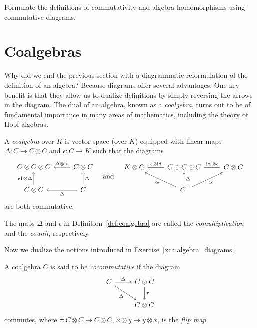 \documentclass[12pt]{amsproc}
\begin{document}
\begin{exercise}
    \label{xca:algebra_diagrams}
    Formulate the definitions of commutativity and algebra homomorphisms using commutative diagrams.
\end{exercise}

\section{Coalgebras}

Why did we end the previous section with a diagrammatic reformulation of the definition of an algebra?
Because diagrams offer several advantages. One key benefit is that they allow us to dualize definitions by simply reversing the arrows in the diagram. The dual of an algebra, known as a \emph{coalgebra}, turns out to be of fundamental importance in many areas of mathematics, including the theory of Hopf algebras.

\begin{definition}
    \label{def:coalgebra}
    A \emph{coalgebra} over $K$ is vector space (over $K$) equipped with linear maps $\Delta\colon C\to C\otimes C$ and 
    $\epsilon\colon C\to K$ such that the diagrams 
    \[
\begin{tikzcd}
C \otimes C \otimes C & C \otimes C \arrow[l, "\Delta \otimes \id"'] \\
C \otimes C\arrow[u, "\id\otimes\Delta"]   & C\arrow[l, "\Delta"]\arrow[u, "\Delta"']
\end{tikzcd}
\quad\text{and}\quad 
\begin{tikzcd}
K\otimes C  & C \otimes C \otimes C\arrow[l, "\epsilon \otimes \id"']\arrow[r, "\id\otimes\epsilon"]  & C \otimes C \\
& C\arrow[lu, "\simeq"]\arrow[u, "\Delta"']\arrow[ru, "\simeq"']\ &
\end{tikzcd}
\]
are both commutative. 
\end{definition}

The maps $\Delta$ and $\epsilon$ in Definition~\ref{def:coalgebra}
are called the \emph{comultiplication} and the \emph{counit}, respectively. 

Now we dualize the notions introduced in Exercise~\ref{xca:algebra_diagrams}.

\begin{definition}
A coalgebra $C$ is said to be \emph{cocommutative} if 
the diagram 
\[
    \begin{tikzcd}
C \arrow[r, "\Delta"] \arrow[dr, "\Delta"'] & C \otimes C \arrow[d, "\tau"] \\
& C \otimes C
\end{tikzcd}
\]
commutes, where $\tau\colon C\otimes C\to C\otimes C$, $x\otimes y\mapsto y\otimes x$, is the \emph{flip map}. 
\end{definition}
\end{document}
